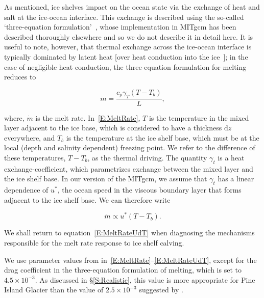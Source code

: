 \documentclass[draft]{agujournal2019}
\begin{document}
As mentioned, ice shelves impact on the ocean state via the exchange of heat and salt at the ice-ocean interface. This exchange is described using the so-called `three-equation formulation'~\cite{Holland1999JPhysOcean}, whose implementation in MITgcm has been described thoroughly elsewhere \cite[for example]{Losch2008JGeophysResOceans, DeRydt2014JGeophysResOceans,Dansereau2014JGROceans} and so we do not describe it in detail here. It is useful to note, however, that thermal exchange across the ice-ocean interface is typically dominated by latent heat [over heat conduction into the ice~\cite{Holland1999JPhysOcean}]; in the case of negligible heat conduction, the three-equation formulation for melting reduces to
\begin{linenomath*}
\begin{equation}\label{E:MeltRate}
    \dot{m} = \frac{c_p \gamma_T (T - T_b)}{L},
\end{equation}
\end{linenomath*}
where, $\dot{m}$ is the melt rate. In~\eqref{E:MeltRate}, $T$ is the temperature in the mixed layer adjacent to the ice base, which is considered to have a thickness $\mathrm{d}z$ everywhere, and $T_b$ is the temperature at the ice shelf base, which must be at the local (depth and salinity dependent) freezing point. We refer to the difference of these temperatures, $T- T_b$, as the thermal driving. The quantity $\gamma_t$ is a heat exchange-coefficient, which parametrizes exchange between the mixed layer and the ice shelf base. In our version of the MITgcm, we assume that $\gamma_t$ has a linear dependence of $u^*$, the ocean speed in the viscous boundary layer that forms adjacent to the ice shelf base. We can therefore write
\begin{linenomath*}
\begin{equation}\label{E:MeltRateUdT}
    \dot{m} \propto u^* (T - T_b).
\end{equation}
\end{linenomath*}
We shall return to equation~\eqref{E:MeltRateUdT} when diagnosing the mechanisms responsible for the melt rate response to ice shelf calving.

We use parameter values from  in~\eqref{E:MeltRate}--\eqref{E:MeltRateUdT}, except for the drag coefficient in the three-equation formulation of melting, which is set to $4.5\times10^{-3}$. As discussed in \S\ref{S:Realistic}, this value is more appropriate for Pine Island Glacier than the value of $2.5\times10^{-3}$ suggested by .
\end{document}
